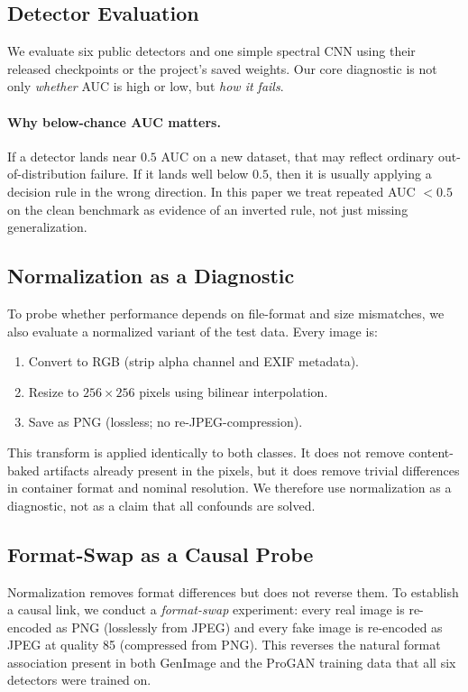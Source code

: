 \documentclass{article}
\begin{document}
\subsection{Detector Evaluation}

We evaluate six public detectors and one simple spectral CNN using their released checkpoints or the project's saved weights.
Our core diagnostic is not only \emph{whether} AUC is high or low, but \emph{how it fails}.

\paragraph{Why below-chance AUC matters.}
If a detector lands near $0.5$ AUC on a new dataset, that may reflect ordinary out-of-distribution failure.
If it lands well below $0.5$, then it is usually applying a decision rule in the wrong direction.
In this paper we treat repeated AUC $< 0.5$ on the clean benchmark as evidence of an inverted rule, not just missing generalization.

\subsection{Normalization as a Diagnostic}

To probe whether performance depends on file-format and size mismatches, we also evaluate a normalized variant of the test data. Every image is:
\begin{enumerate}[itemsep=1pt,topsep=2pt]
  \item Convert to RGB (strip alpha channel and EXIF metadata).
  \item Resize to $256 \times 256$ pixels using bilinear interpolation.
  \item Save as PNG (lossless; no re-JPEG-compression).
\end{enumerate}
This transform is applied identically to both classes.
It does not remove content-baked artifacts already present in the pixels, but it does remove trivial differences in container format and nominal resolution.
We therefore use normalization as a diagnostic, not as a claim that all confounds are solved.

\subsection{Format-Swap as a Causal Probe}

Normalization removes format differences but does not reverse them.
To establish a causal link, we conduct a \emph{format-swap} experiment: every real image is re-encoded as PNG (losslessly from JPEG) and every fake image is re-encoded as JPEG at quality 85 (compressed from PNG).
This reverses the natural format association present in both GenImage and the ProGAN training data that all six detectors were trained on.
\end{document}
